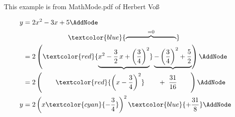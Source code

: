 \documentclass[]{article}
\begin{document}
This example is from  MathMode.pdf of Herbert Vo\ss

\begin{NodesList}[margin=1cm]
  \begin{displaymath}\displaywidth=.2\linewidth
	\begin{aligned} 
	y &= 2x^2 -3x +5                          \AddNode\\
  & \hphantom{= \ 2\left(x^2-\frac{3}{2}\,x\right. }%
      \textcolor{blue}{%
        \overbrace{\hphantom{+\left(\frac{3}{4}\right)^2- %
          \left(\frac{3}{4}\right)^2}}^{=0}}   \\       
  &= 2\left(\textcolor{red}{%
       \underbrace{%
           x^2-\frac{3}{2}\,x + \left(\frac{3}{4}\right)^2}%
   }%
   \underbrace{%
        - \left(\frac{3}{4}\right)^2 + \frac{5}{2}}%
   \right)                                      \AddNode\\
   &= 2\left(\qquad\textcolor{red}{\left(x-\frac{3}{4}\right)^2} 
   \qquad + \ \frac{31}{16}\qquad\right)  \AddNode\\           
y  
   &= 2\left(x\textcolor{cyan}{-\frac{3}{4}}\right)^2\textcolor{blue}{+\frac{31}{8}}\AddNode 
\end{aligned} 
 	     \end{displaymath}
{%
}
	      \end{NodesList}
	 
\end{document}
